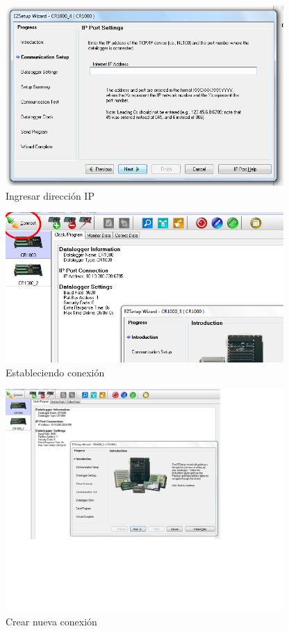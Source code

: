 \begin{figure}[h!]
        \centering
        \includegraphics[width=300pt]{images/pruebas2}
        \caption{Ingresar dirección IP}
        \label{pruebas2}
\end{figure}
\begin{figure}[h!]
        \centering
        \includegraphics[width=300pt]{images/pruebas3}
        \caption{Estableciendo conexión}
        \label{pruebas3}
\end{figure}
\begin{figure}[h!]
        \centering
        \includegraphics[width=300pt]{images/pruebas1}
        \caption{Crear nueva conexión}
        \label{pruebas1}
\end{figure}
